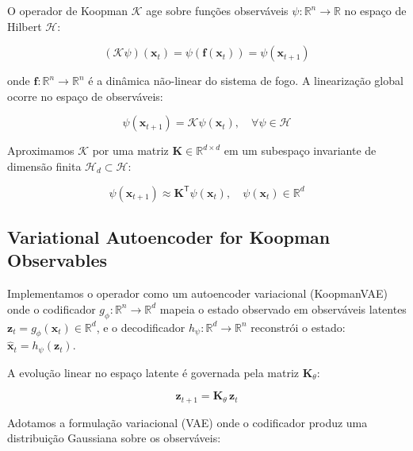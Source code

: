 O operador de Koopman $\mathcal{K}$ age sobre funções observáveis $\psi: \mathbb{R}^n \to \mathbb{R}$ no espaço de Hilbert $\mathcal{H}$:

\begin{equation}
(\mathcal{K} \psi)(\mathbf{x}_t) = \psi(\mathbf{f}(\mathbf{x}_t)) = \psi(\mathbf{x}_{t+1})
\label{eq:koopman_def}
\end{equation}

onde $\mathbf{f}: \mathbb{R}^n \to \mathbb{R}^n$ é a dinâmica não-linear do sistema de fogo. A linearização global ocorre no espaço de observáveis:

\begin{equation}
\psi(\mathbf{x}_{t+1}) = \mathcal{K} \psi(\mathbf{x}_t), \quad \forall \psi \in \mathcal{H}
\label{eq:koopman_linear}
\end{equation}

Aproximamos $\mathcal{K}$ por uma matriz $\mathbf{K} \in \mathbb{R}^{d \times d}$ em um subespaço invariante de dimensão finita $\mathcal{H}_d \subset \mathcal{H}$:

\begin{equation}
\psi(\mathbf{x}_{t+1}) \approx \mathbf{K}^{\mathsf{T}} \psi(\mathbf{x}_t), \quad \psi(\mathbf{x}_t) \in \mathbb{R}^d
\label{eq:koopman_finite}
\end{equation}

\subsection{Variational Autoencoder for Koopman Observables}
\label{sec:vae-koopman}

Implementamos o operador como um autoencoder variacional (KoopmanVAE)~\cite{article:lusch2018,article:takeishi2017} onde o codificador $g_\phi: \mathbb{R}^n \to \mathbb{R}^d$ mapeia o estado observado em observáveis latentes $\mathbf{z}_t = g_\phi(\mathbf{x}_t) \in \mathbb{R}^d$, e o decodificador $h_\psi: \mathbb{R}^d \to \mathbb{R}^n$ reconstrói o estado: $\hat{\mathbf{x}}_t = h_\psi(\mathbf{z}_t)$.

A evolução linear no espaço latente é governada pela matriz $\mathbf{K}_\theta$:

\begin{equation}
\mathbf{z}_{t+1} = \mathbf{K}_\theta \, \mathbf{z}_t
\label{eq:latent_evolution}
\end{equation}

Adotamos a formulação variacional (VAE) onde o codificador produz uma distribuição Gaussiana sobre os observáveis:

